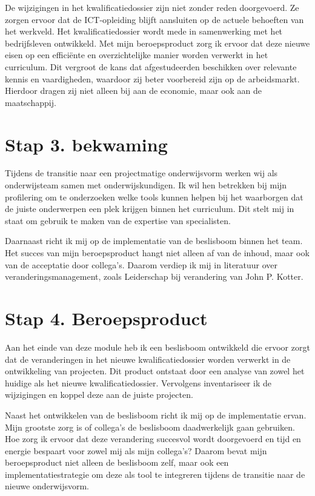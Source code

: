 De wijzigingen in het kwalificatiedossier zijn niet zonder reden doorgevoerd. Ze zorgen ervoor dat de ICT-opleiding blijft aansluiten op de actuele behoeften van het werkveld. Het kwalificatiedossier wordt mede in samenwerking met het bedrijfsleven ontwikkeld. Met mijn beroepsproduct zorg ik ervoor dat deze nieuwe eisen op een efficiënte en overzichtelijke manier worden verwerkt in het curriculum. Dit vergroot de kans dat afgestudeerden beschikken over relevante kennis en vaardigheden, waardoor zij beter voorbereid zijn op de arbeidsmarkt. Hierdoor dragen zij niet alleen bij aan de economie, maar ook aan de maatschappij.

\section{Stap 3. bekwaming}
Tijdens de transitie naar een projectmatige onderwijsvorm werken wij als onderwijsteam samen met onderwijskundigen. Ik wil hen betrekken bij mijn profilering om te onderzoeken welke tools kunnen helpen bij het waarborgen dat de juiste onderwerpen een plek krijgen binnen het curriculum. Dit stelt mij in staat om gebruik te maken van de expertise van specialisten.

Daarnaast richt ik mij op de implementatie van de beslisboom binnen het team. Het succes van mijn beroepsproduct hangt niet alleen af van de inhoud, maar ook van de acceptatie door collega’s. Daarom verdiep ik mij in literatuur over veranderingsmanagement, zoals Leiderschap bij verandering van John P. Kotter.

\section{Stap 4. Beroepsproduct}
Aan het einde van deze module heb ik een beslisboom ontwikkeld die ervoor zorgt dat de veranderingen in het nieuwe kwalificatiedossier worden verwerkt in de ontwikkeling van projecten. Dit product ontstaat door een analyse van zowel het huidige als het nieuwe kwalificatiedossier. Vervolgens inventariseer ik de wijzigingen en koppel deze aan de juiste projecten.

Naast het ontwikkelen van de beslisboom richt ik mij op de implementatie ervan. Mijn grootste zorg is of collega’s de beslisboom daadwerkelijk gaan gebruiken. Hoe zorg ik ervoor dat deze verandering succesvol wordt doorgevoerd en tijd en energie bespaart voor zowel mij als mijn collega’s? Daarom bevat mijn beroepsproduct niet alleen de beslisboom zelf, maar ook een implementatiestrategie om deze als tool te integreren tijdens de transitie naar de nieuwe onderwijsvorm.

